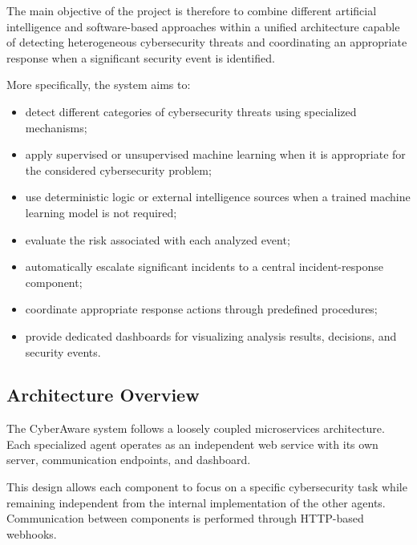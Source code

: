 \documentclass[12pt,a4paper]{report}
\newcommand{\ProjectName}{CyberAware}
\begin{document}
The main objective of the project is therefore to combine different artificial intelligence and software-based approaches within a unified architecture capable of detecting heterogeneous cybersecurity threats and coordinating an appropriate response when a significant security event is identified.

More specifically, the system aims to:

\begin{itemize}[nosep]
    \item detect different categories of cybersecurity threats using
    specialized mechanisms;

    \item apply supervised or unsupervised machine learning when it is
    appropriate for the considered cybersecurity problem;

    \item use deterministic logic or external intelligence sources when a
    trained machine learning model is not required;

    \item evaluate the risk associated with each analyzed event;

    \item automatically escalate significant incidents to a central
    incident-response component;

    \item coordinate appropriate response actions through predefined
    procedures;

    \item provide dedicated dashboards for visualizing analysis results,
    decisions, and security events.

\end{itemize}

\subsection{Architecture Overview}

The \ProjectName{} system follows a loosely coupled microservices architecture. Each specialized agent operates as an independent web service with its own server, communication endpoints, and dashboard.

This design allows each component to focus on a specific cybersecurity task while remaining independent from the internal implementation of the other agents. Communication between components is performed through HTTP-based webhooks.
\end{document}
